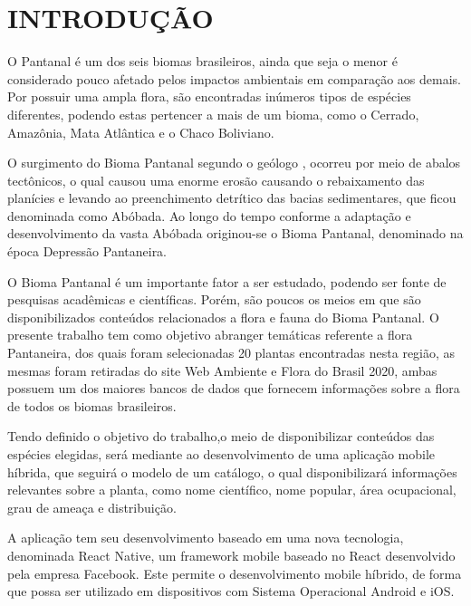 
\chapter{INTRODUÇÃO}
\label{chap:introducao}

O Pantanal é um dos seis biomas brasileiros, ainda que seja o menor é considerado  pouco afetado pelos impactos ambientais em comparação aos demais. Por possuir uma ampla flora, são encontradas inúmeros tipos de espécies diferentes, podendo estas pertencer a mais de um bioma, como o Cerrado, Amazônia, Mata Atlântica e o Chaco Boliviano.

O surgimento do Bioma Pantanal segundo o geólogo , ocorreu por meio de abalos tectônicos, o qual causou uma enorme erosão causando o rebaixamento das planícies e levando ao preenchimento detrítico das bacias sedimentares, que ficou denominada como Abóbada. Ao longo do tempo conforme a adaptação e desenvolvimento da vasta Abóbada originou-se o Bioma Pantanal, denominado na época Depressão Pantaneira. 

O Bioma Pantanal é um importante fator a ser estudado, podendo ser fonte de pesquisas acadêmicas e científicas. Porém, são poucos os meios em que são disponibilizados  conteúdos relacionados a flora e fauna do Bioma Pantanal. O presente trabalho tem como objetivo abranger temáticas referente a flora Pantaneira, dos quais foram selecionadas 20 plantas encontradas nesta região, as mesmas foram retiradas do site Web Ambiente e Flora do Brasil 2020, ambas possuem um dos maiores bancos de dados que fornecem informações sobre a flora de todos os biomas brasileiros. 

Tendo definido o objetivo do trabalho,o meio de disponibilizar conteúdos das espécies elegidas, será mediante ao desenvolvimento de uma aplicação mobile híbrida, que seguirá o modelo de um catálogo, o qual disponibilizará informações relevantes sobre a planta, como nome científico, nome popular, área ocupacional, grau de ameaça  e distribuição.

A aplicação tem seu desenvolvimento baseado em uma nova tecnologia, denominada React Native, um framework mobile baseado no React desenvolvido pela empresa Facebook. Este permite o desenvolvimento mobile híbrido, de forma que possa ser utilizado em dispositivos com Sistema Operacional Android e iOS.
